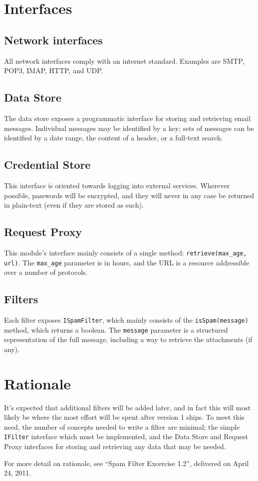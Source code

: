 \documentclass[11pt,letterpaper]{article}
\begin{document}
\section{Interfaces}

\subsection{Network interfaces}
All network interfaces comply with an internet standard.  Examples are SMTP,
POP3, IMAP, HTTP, and UDP.

\subsection{Data Store}
The data store exposes a programmatic interface for storing and retrieving
email messages.  Individual messages may be identified by a key; sets of
messages can be identified by a date range, the content of a header, or a
full-text search.

\subsection{Credential Store}
This interface is oriented towards logging into external services.  Wherever
possible, passwords will be encrypted, and they will never in any case be
returned in plain-text (even if they are stored as such).

\subsection{Request Proxy}
This module's interface mainly consists of a single method:
\texttt{retrieve(max\_age, url)}.  The \texttt{max\_age} parameter is in hours,
and the URL is a resource addressible over a number of protocols.

\subsection{Filters}
Each filter exposes \texttt{ISpamFilter}, which mainly consists of the
\texttt{isSpam(message)} method, which returns a boolean.  The
\texttt{message} parameter is a structured representation of the full message,
including a way to retrieve the attachments (if any).


\section{Rationale}

It's expected that additional filters will be added later, and in fact this
will most likely be where the most effort will be spent after version 1
ships.  To meet this need, the number of concepts needed to write a filter are
minimal; the simple \texttt{IFilter} interface which must be implemented, and
the Data Store and Request Proxy interfaces for storing and retrieving any
data that may be needed.

For more detail on rationale, see ``Spam Filter Excercise 1.2'', delivered on
April 24, 2011.
\end{document}
